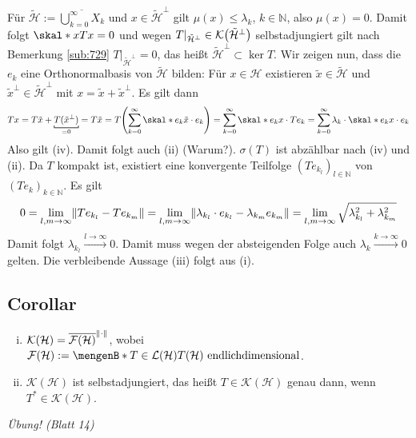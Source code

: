 Für $\tilde{\mathcal{H}} := \overline{\bigcup_{k=0}^\infty X_k}$ und $x \in \tilde{\mathcal{H}}^\bot$ gilt $\mu(x) \le \lambda_k$, $k \in \mathds{N}$, also $\mu(x)=0$.
Damit folgt $\skal*{x}{T x}=0$ und wegen $T|_{\tilde{\mathcal{H}}^\bot} \in \mathcal{K} \enbrace[\big]{\tilde{\mathcal{H}}^\bot}$ selbstadjungiert gilt nach Bemerkung 
\ref{sub:729} $T|_{\tilde{\mathcal{H}}^\bot} =0$, das heißt $\tilde{\mathcal{H}}^\bot \subset \ker T$.
Wir zeigen nun, dass die $e_k$ eine Orthonormalbasis von $\tilde{\mathcal{H}}$ bilden:
Für $x \in \mathcal{H}$ existieren $\tilde{x} \in \tilde{\mathcal{H}}$ und $\tilde{x}^\bot \in \tilde{\mathcal{H}}^\bot$ mit $x= \tilde{x} + \tilde{x}^\bot$. Es gilt dann 
\[
	T x = T \tilde{x} + \underbracket[0.7pt][2pt]{T(\tilde{x}^\bot)}_{=0} = T \tilde{x} = T \enbrace*{\sum_{k=0}^{\infty} \skal*{e_k}{\tilde{x}} \cdot e_k} 
	= \sum_{k=0}^{\infty} \skal*{e_k}{x} \cdot T e_k = \sum_{k=0}^{\infty} \lambda_k \cdot \skal*{e_k}{x} \cdot e_k 
\]
Also gilt (iv). Damit folgt auch (ii) (Warum?).
$\sigma(T)$ ist abzählbar nach (iv) und (ii).
Da $T$ kompakt ist, existiert eine konvergente Teilfolge $(T e_{k_l})_{l \in \mathds{N}}$ von $(T e_k)_{k \in \mathds{N}}$. Es gilt
\[
	0=\lim_{l,m \to \infty} \norm{T e_{k_l} - T e_{k_m}} = \lim_{l,m \to \infty} \norm{\lambda_{k_l} \cdot e_{k_l} - \lambda_{k_m} e_{k_m}} = 
	\lim_{l,m \to \infty}  \sqrt{\lambda_{k_l}^2 + \lambda_{k_m}^2}  
\]
Damit folgt $\lambda_{k_l} \xrightarrow{l \to \infty} 0$. Damit muss wegen der absteigenden Folge auch $\lambda_k \xrightarrow{k \to \infty} 0$ gelten. 
Die verbleibende Aussage (iii) folgt aus (i). \bewende

\subsection[Corollar: Approximierbarkeit kompakter Operatoren und $\mathcal{K}(\mathcal{H})$ ist selbstadjungiert]{Corollar} %
\label{sub:811}
\begin{enumerate}[(i)]
	\item $\mathcal{K}(\mathcal{H})= \overline{\mathcal{F}(\mathcal{H})}^{\norm{\cdot}}$, wobei 
	$\mathcal{F}(\mathcal{H}) := \set[T \in \mathcal{L}(\mathcal{H})]{T(\mathcal{H}) \text{ endlichdimensional}}$.
	\item $\mathcal{K}(\mathcal{H})$ ist selbstadjungiert, das heißt $T \in \mathcal{K}(\mathcal{H})$ genau dann, wenn $ T^* \in \mathcal{K}(\mathcal{H})$.
\end{enumerate}
\emph{Übung! (Blatt 14)} \bewende
\newpage

